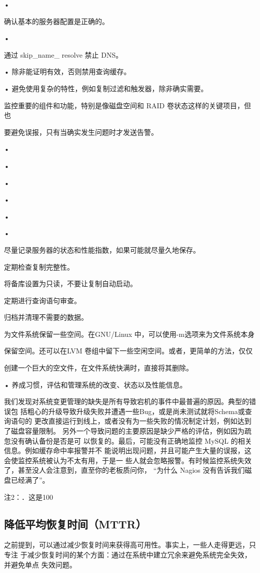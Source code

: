 •

确认基本的服务器配置是正确的。

•

通过 skip\_name\_ resolve 禁止 DNS。

• 除非能证明有效，否则禁用查询缓存。

• 避免使用复杂的特性，例如复制过滤和触发器，除非确实需要。

监控重要的组件和功能，特别是像磁盘空间和 RAID 卷状态这样的关键项目，但也

要避免误报，只有当确实发生问题时才发送告警。

•

•

•

•

•

•

尽量记录服务器的状态和性能指数，如果可能就尽量久地保存。

定期检查复制完整性。

将备库设置为只读，不要让复制自动启动。

定期进行查询语句审查。

归档并清理不需要的数据。

为文件系统保留一些空间。在GNU/Linux 中，可以使用-m选项来为文件系统本身

保留空间。还可以在LVM 卷组中留下一些空闲空间。或者，更简单的方法，仅仅

创建一个巨大的空文件，在文件系统快满时，直接将其删除。

• 养成习惯，评估和管理系统的改变、状态以及性能信息。

我们发现对系统变更管理的缺失是所有导致宕机的事件中最普遍的原因。典型的错误包
括粗心的升级导致升级失败并遭遇一些Bug，或是尚未测试就将Schema或查询语句的
更改直接运行到线上，或者没有为一些失败的情况制定计划，例如达到了磁盘容量限制。
另外一个导致问题的主要原因是缺少严格的评估，例如因为疏忽没有确认备份是否是可
以恢复的。最后，可能没有正确地监控 MySQL 的相关信息。例如缓存命中率报警并不
能说明出现问题，并且可能产生大量的误报，这会使监控系统被认为不太有用，于是一
些人就会忽略报警。有时候监控系统失效了，甚至没人会注意到，直至你的老板质问你，
“为什么 Nagios 没有告诉我们磁盘已经满了”。

注2：．这是100%

\subsection{降低平均恢复时间（MTTR）}
之前提到，可以通过减少恢复时间来获得高可用性。事实上，一些人走得更远，只专注
于减少恢复时间的某个方面：通过在系统中建立冗余来避免系统完全失效，并避免单点
失效问题。

